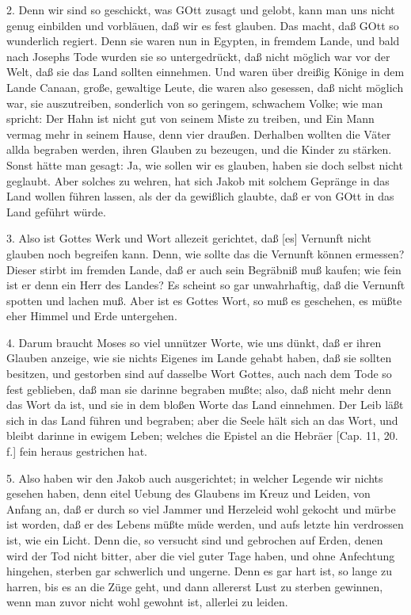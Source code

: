 2. Denn wir sind so geschickt, was GOtt zusagt und gelobt, kann man uns nicht genug einbilden und vorbläuen, daß wir es fest glauben. Das macht, daß GOtt so wunderlich regiert. Denn sie waren nun in Egypten, in fremdem Lande, und bald nach Josephs Tode wurden sie so untergedrückt, daß nicht möglich war vor der Welt, daß sie das Land sollten einnehmen. Und waren über dreißig Könige in dem Lande Canaan, große, gewaltige Leute, die waren also gesessen, daß nicht möglich war, sie auszutreiben, sonderlich von so geringem, schwachem Volke; wie man spricht: Der Hahn ist nicht gut von seinem Miste zu treiben, und Ein Mann vermag mehr in seinem Hause, denn vier draußen. Derhalben wollten die Väter allda begraben werden, ihren Glauben zu bezeugen, und die Kinder zu stärken. Sonst hätte man gesagt: Ja, wie sollen wir es glauben, haben sie doch selbst nicht geglaubt. Aber solches zu wehren, hat sich Jakob mit solchem Gepränge in das Land wollen führen lassen, als der da gewißlich glaubte, daß er von GOtt in das Land geführt würde.

3. Also ist Gottes Werk und Wort allezeit gerichtet, daß [es] Vernunft nicht glauben noch begreifen kann. Denn, wie sollte das die Vernunft können ermessen? Dieser stirbt im fremden Lande, daß er auch sein Begräbniß muß kaufen; wie fein ist er denn ein Herr des Landes? Es scheint so gar unwahrhaftig, daß die Vernunft spotten und lachen muß. Aber ist es Gottes Wort, so muß es geschehen, es müßte eher Himmel und Erde untergehen.

4. Darum braucht Moses so viel unnützer Worte, wie uns dünkt, daß er ihren Glauben
anzeige, wie sie nichts Eigenes im Lande gehabt haben, daß sie sollten besitzen, und gestorben sind auf dasselbe Wort Gottes, auch nach dem Tode so fest geblieben, daß man sie darinne begraben mußte; also, daß nicht mehr denn das Wort da ist, und sie in dem bloßen Worte das Land einnehmen. Der Leib läßt sich in das Land führen und begraben; aber die Seele hält sich an das Wort, und bleibt darinne in ewigem Leben; welches die Epistel an die Hebräer [Cap. 11, 20. f.] fein heraus gestrichen hat.

5. Also haben wir den Jakob auch ausgerichtet; in welcher Legende wir nichts gesehen haben, denn eitel Uebung des Glaubens im Kreuz und Leiden, von Anfang an, daß er durch so viel Jammer und Herzeleid wohl gekocht und mürbe ist worden, daß er des Lebens müßte müde werden, und aufs letzte hin verdrossen ist, wie ein Licht. Denn die, so versucht sind und gebrochen auf Erden, denen wird der Tod nicht bitter, aber die viel guter Tage haben, und ohne Anfechtung hingehen, sterben gar schwerlich und ungerne. Denn es gar hart ist, so lange zu harren, bis es an die Züge geht, und dann allererst Lust zu sterben gewinnen, wenn man zuvor nicht wohl gewohnt ist, allerlei zu leiden.

